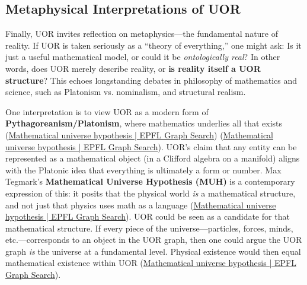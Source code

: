\documentclass[12pt]{article}
\begin{document}
\subsection{Metaphysical Interpretations of UOR}

Finally, UOR invites reflection on metaphysics---the fundamental nature of reality. If UOR is taken seriously as a ``theory of everything,'' one might ask: Is it just a useful mathematical model, or could it be \emph{ontologically real}? In other words, does UOR merely describe reality, or \textbf{is reality itself a UOR structure}? This echoes longstanding debates in philosophy of mathematics and science, such as Platonism vs. nominalism, and structural realism.

\medskip

One interpretation is to view UOR as a modern form of \textbf{Pythagoreanism/Platonism}, where mathematics underlies all that exists (\href{https://graphsearch.epfl.ch/concept/2148329#:~:text=In%20physics%20and%20cosmology%2C%20the,will}{Mathematical universe hypothesis | EPFL Graph Search}) (\href{https://graphsearch.epfl.ch/concept/2148329#:~:text=theory%20can%20be%20considered%20a,claims%20that%20the%20hypothesis%20has}{Mathematical universe hypothesis | EPFL Graph Search}). UOR’s claim that any entity can be represented as a mathematical object (in a Clifford algebra on a manifold) aligns with the Platonic idea that everything is ultimately a form or number. Max Tegmark’s \textbf{Mathematical Universe Hypothesis (MUH)} is a contemporary expression of this: it posits that the physical world \emph{is} a mathematical structure, and not just that physics uses math as a language (\href{https://graphsearch.epfl.ch/concept/2148329#:~:text=proposed%20by%20cosmologist%20Max%20Tegmark,The}{Mathematical universe hypothesis | EPFL Graph Search}). UOR could be seen as a candidate for that mathematical structure. If every piece of the universe---particles, forces, minds, etc.---corresponds to an object in the UOR graph, then one could argue the UOR graph \emph{is} the universe at a fundamental level. Physical existence would then equal mathematical existence within UOR (\href{https://graphsearch.epfl.ch/concept/2148329#:~:text=proposed%20by%20cosmologist%20Max%20Tegmark,The}{Mathematical universe hypothesis | EPFL Graph Search}).

\medskip
\end{document}
